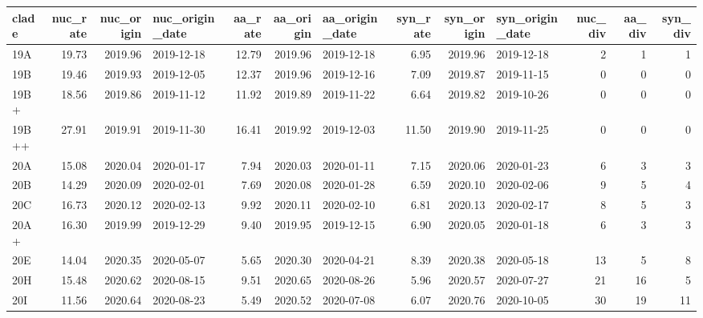 \begin{tabular}{lrrlrrlrrlrrr}
\toprule
clade &  nuc\_rate &  nuc\_origin & nuc\_origin\_date &  aa\_rate &  aa\_origin & aa\_origin\_date &  syn\_rate &  syn\_origin & syn\_origin\_date &  nuc\_div &  aa\_div &  syn\_div \\
\midrule
  19A &     19.73 &     2019.96 &      2019-12-18 &    12.79 &    2019.96 &     2019-12-18 &      6.95 &     2019.96 &      2019-12-18 &        2 &       1 &        1 \\
  19B &     19.46 &     2019.93 &      2019-12-05 &    12.37 &    2019.96 &     2019-12-16 &      7.09 &     2019.87 &      2019-11-15 &        0 &       0 &        0 \\
 19B+ &     18.56 &     2019.86 &      2019-11-12 &    11.92 &    2019.89 &     2019-11-22 &      6.64 &     2019.82 &      2019-10-26 &        0 &       0 &        0 \\
19B++ &     27.91 &     2019.91 &      2019-11-30 &    16.41 &    2019.92 &     2019-12-03 &     11.50 &     2019.90 &      2019-11-25 &        0 &       0 &        0 \\
  20A &     15.08 &     2020.04 &      2020-01-17 &     7.94 &    2020.03 &     2020-01-11 &      7.15 &     2020.06 &      2020-01-23 &        6 &       3 &        3 \\
  20B &     14.29 &     2020.09 &      2020-02-01 &     7.69 &    2020.08 &     2020-01-28 &      6.59 &     2020.10 &      2020-02-06 &        9 &       5 &        4 \\
  20C &     16.73 &     2020.12 &      2020-02-13 &     9.92 &    2020.11 &     2020-02-10 &      6.81 &     2020.13 &      2020-02-17 &        8 &       5 &        3 \\
 20A+ &     16.30 &     2019.99 &      2019-12-29 &     9.40 &    2019.95 &     2019-12-15 &      6.90 &     2020.05 &      2020-01-18 &        6 &       3 &        3 \\
  20E &     14.04 &     2020.35 &      2020-05-07 &     5.65 &    2020.30 &     2020-04-21 &      8.39 &     2020.38 &      2020-05-18 &       13 &       5 &        8 \\
  20H &     15.48 &     2020.62 &      2020-08-15 &     9.51 &    2020.65 &     2020-08-26 &      5.96 &     2020.57 &      2020-07-27 &       21 &      16 &        5 \\
  20I &     11.56 &     2020.64 &      2020-08-23 &     5.49 &    2020.52 &     2020-07-08 &      6.07 &     2020.76 &      2020-10-05 &       30 &      19 &       11 \\

\end{tabular}

